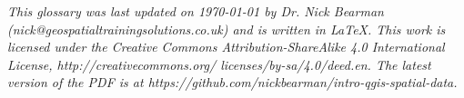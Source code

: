 \documentclass[a4paper,10pt]{article}
\begin{document}
\begin{center}

{\footnotesize \textit{This glossary was last updated on {\today} by Dr. Nick Bearman (nick@geospatialtrainingsolutions.co.uk) and is written in LaTeX. This work is licensed under the Creative Commons Attribution-ShareAlike 4.0 International License, http://creativecommons.org/ licenses/by-sa/4.0/deed.en. The latest version of the PDF is at https://github.com/nickbearman/intro-qgis-spatial-data.}}

\end{center}
\end{document}
